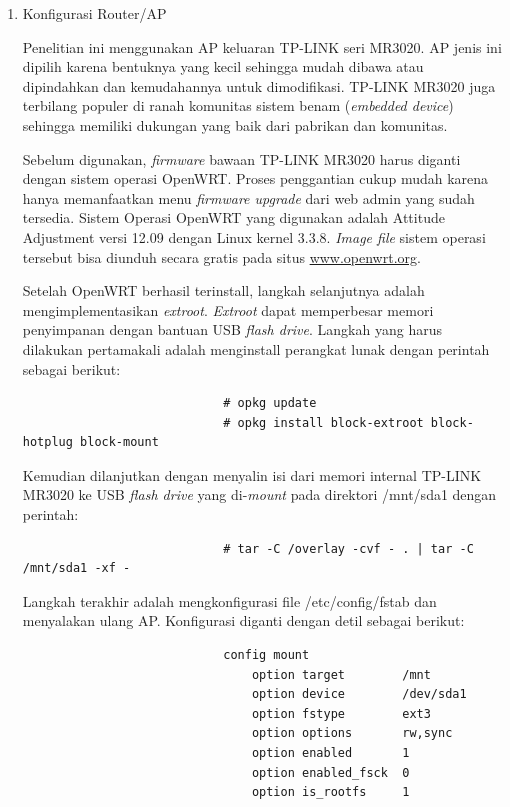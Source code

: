 			\begin{enumerate}
				\item Konfigurasi Router/AP

					Penelitian ini menggunakan AP keluaran TP-LINK seri MR3020. AP jenis ini dipilih karena bentuknya yang kecil sehingga mudah dibawa atau dipindahkan dan kemudahannya untuk dimodifikasi. TP-LINK MR3020 juga terbilang populer di ranah komunitas sistem benam (\emph{embedded device}) sehingga memiliki dukungan yang baik dari pabrikan dan komunitas. 

					Sebelum digunakan, \emph{firmware} bawaan TP-LINK MR3020 harus diganti dengan sistem operasi OpenWRT. Proses penggantian cukup mudah karena hanya memanfaatkan menu \emph{firmware upgrade} dari web admin yang sudah tersedia.	Sistem Operasi OpenWRT yang digunakan adalah Attitude Adjustment versi 12.09 dengan Linux kernel 3.3.8. \emph{Image file} sistem operasi tersebut bisa diunduh secara gratis pada situs \url{www.openwrt.org}.

					Setelah OpenWRT berhasil terinstall, langkah selanjutnya adalah mengimplementasikan \emph{extroot}. \emph{Extroot} dapat memperbesar memori penyimpanan dengan bantuan USB \emph{flash drive}. Langkah yang harus dilakukan pertamakali adalah menginstall perangkat lunak dengan perintah sebagai berikut:
					\begingroup
					    \fontsize{10pt}{12pt}\selectfont
					    \begin{verbatim}
							# opkg update
							# opkg install block-extroot block-hotplug block-mount
					    \end{verbatim}  
					\endgroup

					Kemudian dilanjutkan dengan menyalin isi dari memori internal TP-LINK MR3020 ke USB \emph{flash drive} yang di-\emph{mount} pada direktori /mnt/sda1 dengan perintah:
					\begingroup
					    \fontsize{10pt}{12pt}\selectfont
					    \begin{verbatim}
							# tar -C /overlay -cvf - . | tar -C /mnt/sda1 -xf -
					    \end{verbatim}  
					\endgroup

					Langkah terakhir adalah mengkonfigurasi file /etc/config/fstab dan menyalakan ulang AP. Konfigurasi diganti dengan detil sebagai berikut:
					\begingroup
					    \fontsize{10pt}{12pt}\selectfont
					    \begin{verbatim}
							config mount
						        option target        /mnt
						        option device        /dev/sda1
						        option fstype        ext3
						        option options       rw,sync
						        option enabled       1
						        option enabled_fsck  0
						        option is_rootfs     1
					    \end{verbatim}  
					\endgroup


\end{enumerate}
